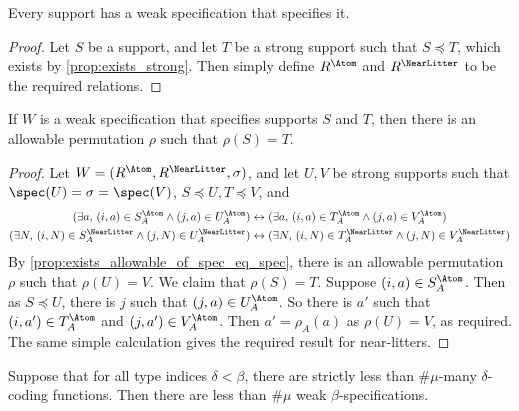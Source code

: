 \begin{proposition}
  \label{prop:exists_weakSpec}
  Every support has a weak specification that specifies it.
\end{proposition}
\begin{proof}
  Let \( S \) be a support, and let \( T \) be a strong support such that \( S \preceq T \), which exists by \cref{prop:exists_strong}.
  Then simply define \( R^\Atom \) and \( R^\NearLitter \) to be the required relations.
\end{proof}
\begin{proposition}
  \label{prop:exists_allowable_of_weakSpec}
  If \( W \) is a weak specification that specifies supports \( S \) and \( T \), then there is an allowable permutation \( \rho \) such that \( \rho(S) = T \).
\end{proposition}
\begin{proof}
  Let \( W = (R^\Atom, R^\NearLitter, \sigma) \), and let \( U, V \) be strong supports such that \( \spec(U) = \sigma = \spec(V) \), \( S \preceq U, T \preceq V \), and
  \begin{align*}
    (\exists a,\, (i, a) \in S_A^\Atom \wedge (j, a) \in U_A^\Atom) &\leftrightarrow (\exists a,\, (i, a) \in T_A^\Atom \wedge (j, a) \in V_A^\Atom) \\
    (\exists N,\, (i, N) \in S_A^\NearLitter \wedge (j, N) \in U_A^\NearLitter) &\leftrightarrow (\exists N,\, (i, N) \in T_A^\NearLitter \wedge (j, N) \in V_A^\NearLitter)
  \end{align*}
  By \cref{prop:exists_allowable_of_spec_eq_spec}, there is an allowable permutation \( \rho \) such that \( \rho(U) = V \).
  We claim that \( \rho(S) = T \).
  Suppose \( (i, a) \in S_A^\Atom \).
  Then as \( S \preceq U \), there is \( j \) such that \( (j, a) \in U_A^\Atom \).
  So there is \( a' \) such that \( (i, a') \in T_A^\Atom \) and \( (j, a') \in V_A^\Atom \).
  Then \( a' = \rho_A(a) \) as \( \rho(U) = V \), as required.
  The same simple calculation gives the required result for near-litters.
\end{proof}
\begin{proposition}
  \label{prop:card_weakSpec}
  Suppose that for all type indices \( \delta < \beta \), there are strictly less than \( \#\mu \)-many \( \delta \)-coding functions.
  Then there are less than \( \#\mu \) weak \( \beta \)-specifications.
\end{proposition}
